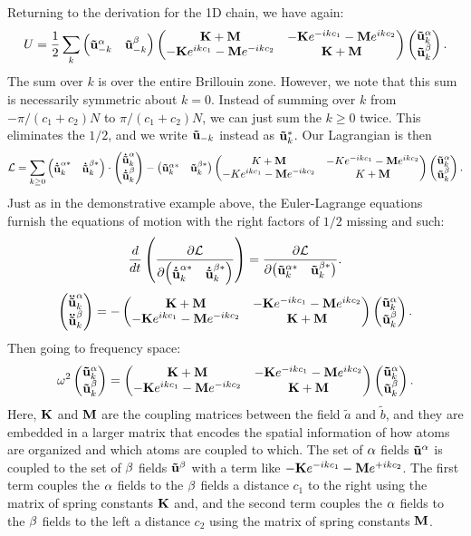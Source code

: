 \documentclass[12pt]{article}
\begin{document}
Returning to the derivation for the 1D chain, we have again:
\[ U = \frac{1}{2} \sum_k \left(\begin{matrix} \mathbf{\tilde u}^\alpha_{-k} & \mathbf{\tilde u}^\beta_{-k}\end{matrix}\right) 
\left(\begin{matrix} \mathbf{K} + \mathbf{M} & - \mathbf{K} e^{-ikc_1} - \mathbf{M}e^{ikc_2} \\ - \mathbf{K}e^{ikc_1} - \mathbf{M}e^{-ikc_2} & 
\mathbf{K}+\mathbf{M}\end{matrix}\right) \left(\begin{matrix} \mathbf{\tilde u}^\alpha_k \\ \mathbf{\tilde u}^\beta_k \end{matrix}\right).\]
The sum over $k$ is over the entire Brillouin zone. However, we note that this 
sum is necessarily symmetric about $k=0$. Instead of summing over $k$ from 
$-\pi/(c_1+c_2)N$ to $\pi/(c_1+c_2)N$, we can just sum the $k\geq0$ twice. This 
eliminates the $1/2$, and we write $\mathbf{\tilde u}_{-k}$ instead as $\mathbf{\tilde
u}_{k}^*$. Our Lagrangian is then
\[ \mathcal{L} = \sum_{k\geq 0} \pmtrx{ \bv{\dot{\tilde u}}^{\a *}_{k} & 
\bv{\dot{\tilde u}}^{\b *}_{k}} \cdot \pmtrx{ \bv{\dot{\tilde u}}^\a_k \\ 
\bv{\dot{\tilde u}}^\b_k } - 
\pmtrx{ \bv{\tilde u}^{\a *}_{k} & \bv{\tilde 
u}^{\b *}_{k}} \pmtrx{ \bv \bv K + \bv M & - \bv \bv K e^{-ikc_1} - \bv Me^{ikc_2} \\ - \bv \bv Ke^{ikc_1} - 
\bv Me^{-ikc_2} & \bv \bv K+\bv M} \pmtrx{ \bv{\tilde u}^\a_k \\ \bv{\tilde u}^\b_k }.\]
Just as in the demonstrative example above, the Euler-Lagrange equations 
furnish the equations of motion with the right factors of $1/2$ missing and 
such:
\[ \frac{d {}}{d {t}} \left( \frac{\partial {\mathcal{L}}}{\partial {\left(\begin{matrix} \mathbf{\dot{\tilde u}}^{\alpha*}_{k} 
& 
\mathbf{\dot{\tilde u}}^{\beta*}_{k}\end{matrix}\right) }} \right) = \frac{\partial {\mathcal{L}}}{\partial { \left(\begin{matrix} \mathbf{\tilde 
u}^{\alpha*}_{k} & \mathbf{\tilde 
u}^{\beta*}_{k}\end{matrix}\right) }}.\]
\[ \left(\begin{matrix} \mathbf{\ddot{\tilde u}}^\alpha_k \\ \mathbf{\ddot{\tilde u}}^\beta_k \end{matrix}\right) = -\left(\begin{matrix} 
\mathbf{K} + \mathbf{M} & - \mathbf{K} e^{-ikc_1} - \mathbf{M}e^{ikc_2} \\ - \mathbf{K}e^{ikc_1} - 
\mathbf{M}e^{-ikc_2} & \mathbf{K}+\mathbf{M}\end{matrix}\right) \left(\begin{matrix} \mathbf{\tilde u}^\alpha_k \\ \mathbf{\tilde u}^\beta_k \end{matrix}\right).\]
Then going to frequency space:
\[ \omega^2 \left(\begin{matrix} \mathbf{\tilde u}^\alpha_k \\ \mathbf{\tilde u}^\beta_k \end{matrix}\right) = 
\left(\begin{matrix} 
\mathbf{K} + \mathbf{M} & - \mathbf{K} e^{-ikc_1} - \mathbf{M}e^{ikc_2} \\ - \mathbf{K}e^{ikc_1} - 
\mathbf{M}e^{-ikc_2} & \mathbf{K}+\mathbf{M}\end{matrix}\right) \left(\begin{matrix} \mathbf{\tilde u}^\alpha_k \\ \mathbf{\tilde u}^\beta_k \end{matrix}\right).\]
Here, $\mathbf{K}$ and $\mathbf{M}$ are the coupling matrices between the field $\tilde a$ and 
$\tilde b$, and they are embedded in a larger matrix that encodes the spatial 
information of how atoms are organized and which atoms are coupled to which. 
The set of $\alpha$ fields $\mathbf{\tilde u}^\alpha$ is coupled to the set of $\beta$ 
fields $\mathbf{\tilde u}^\beta$ with a term like $-\mathbf{K} e^{-ikc_1} -\mathbf{M} e^{+ikc_2}$. 
The first term couples the $\alpha$ fields to the $\beta$ fields a 
distance $c_1$ to the right using the matrix of spring constants $\mathbf{K}$ and, and 
the second term couples the $\alpha$ fields to the $\beta$ fields to the left a 
distance $c_2$ using the matrix of spring constants $\mathbf{M}$.
\end{document}
